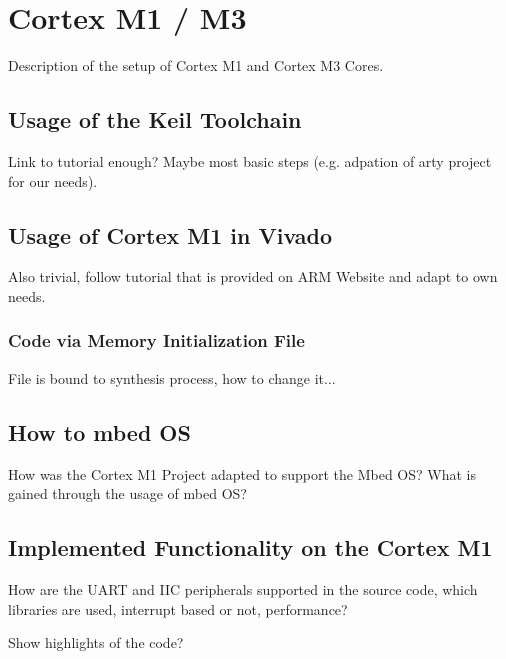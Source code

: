 \section{Cortex M1 / M3}

Description of the setup of Cortex M1 and Cortex M3 Cores. \cite{arm_arm_2018} \cite{arm_cortex-m1_nodate}

\subsection{Usage of the Keil Toolchain}

Link to tutorial enough? Maybe most basic steps (e.g. adpation of arty project for our needs). \cite{noauthor_getting_nodate}

\subsection{Usage of Cortex M1 in Vivado}

Also trivial, follow tutorial that is provided on ARM Website and adapt to own needs.

\subsubsection{Code via Memory Initialization File}

File is bound to synthesis process, how to change it...

\subsection{How to mbed OS}

How was the Cortex M1 Project adapted to support the Mbed OS?
What is gained through the usage of mbed OS?

\subsection{Implemented Functionality on the Cortex M1}

How are the UART and IIC peripherals supported in the source code, which libraries are used, interrupt based or not, performance?

Show highlights of the code?
